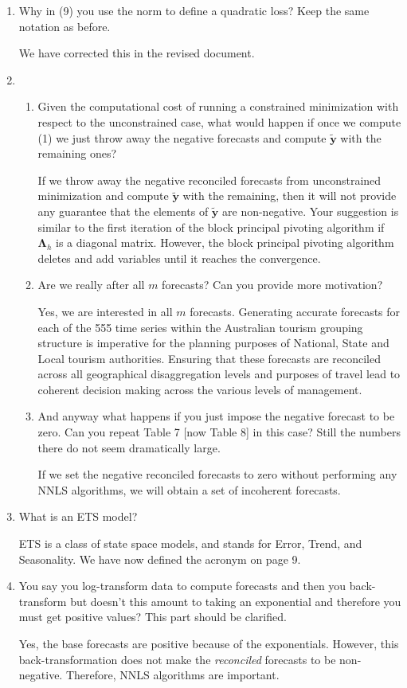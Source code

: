 \documentclass[10pt,a4paper]{article}
\begin{document}
\begin{enumerate}
\item
  Why in (9) you use the norm to define a quadratic loss? Keep the same notation as before.

  {\color{blue} We have corrected this in the revised document.}

\item
  \begin{enumerate}
  \item
    Given the computational cost of running a constrained minimization with respect to the unconstrained case, what would happen if once we compute (1) we just throw away the negative forecasts and compute $\tilde{\bm{y}}$ with the remaining ones?

    {\color{blue} If we throw away the negative reconciled forecasts from unconstrained minimization and compute $\tilde{\bm{y}}$ with the remaining, then it will not provide any guarantee that the elements of $\tilde{\bm{y}}$ are non-negative. Your suggestion is similar to the first iteration of the block principal pivoting algorithm if $\bm{\Lambda}_h$ is a diagonal matrix. However, the block principal pivoting algorithm deletes and add variables until it reaches the convergence.}

  \item
    Are we really after all $m$ forecasts? Can you provide more motivation?

    {\color{blue} Yes, we are interested in all $m$ forecasts. Generating accurate forecasts for each of the 555 time series within the Australian tourism grouping structure is imperative for the planning purposes of National, State and Local tourism authorities. Ensuring that these forecasts are reconciled across all geographical disaggregation levels and purposes of travel lead to coherent decision making across the various levels of management.}

  \item
    And anyway what happens if you just impose the negative forecast to be zero. Can you repeat Table 7 {\color{blue} [now Table 8]} in this case? Still the numbers there do not seem dramatically large.

    {\color{blue} If we set the negative reconciled forecasts to zero without performing any NNLS algorithms, we will obtain a set of incoherent forecasts.}
  \end{enumerate}

\item
  What is an ETS model?

  {\color{blue} ETS is a class of state space models, and stands for Error, Trend, and Seasonality. We have now defined the acronym on page 9.}

\item
  You say you log-transform data to compute forecasts and then you back-transform but doesn't this amount to taking an exponential and therefore you must get positive values? This part should be clarified.

  {\color{blue} Yes, the base forecasts are positive because of the exponentials. However, this back-transformation does not make the \emph{reconciled} forecasts to be non-negative. Therefore, NNLS algorithms are important.}
\end{enumerate}

\printbibliography
\end{document}
